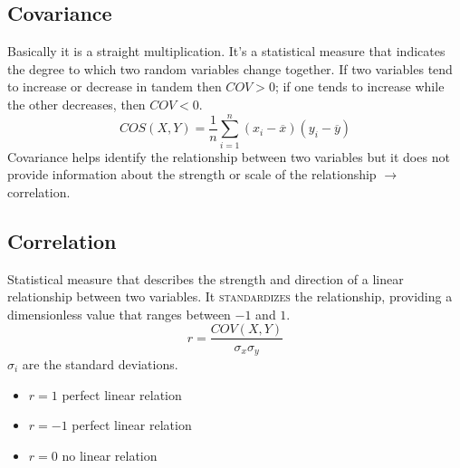\subsection{Covariance}
Basically it is a straight multiplication. It's a statistical measure that indicates the degree to which two random variables change together. If two variables tend to increase or decrease in tandem then $COV>0$; if one tends to increase while the other decreases, then $COV<0$.
\begin{equation}
	COS(X,Y)=\frac{1}{n}\sum_{i=1}^n(x_i-\overline{x})(y_i-\overline{y})
\end{equation}
Covariance helps identify the relationship between two variables but it does not provide information about the strength or scale of the relationship $\rightarrow$ correlation.
\subsection{Correlation}
Statistical measure that describes the strength and direction of a linear relationship between two variables. It \textsc{standardizes} the relationship, providing a dimensionless value that ranges between $-1$ and $1$.
\begin{equation}
	r=\frac{COV(X,Y)}{\sigma_x\sigma_y}
\end{equation}
$\sigma_i$ are the standard deviations.
\begin{itemize}
	\item $r=1$ perfect  linear relation
	\item $r=-1$  perfect  linear relation
	\item $r=0$ no linear relation
\end{itemize}